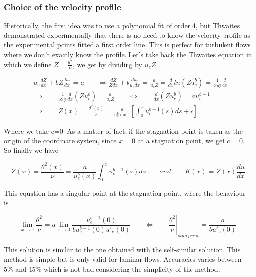 \subsubsection{Choice of the velocity profile}
Historically, the first idea was to use a polynomial fit of order 4, but Thwaites demonstrated experimentally that there is no need to know the velocity profile as the experimental points fitted a first order line. This is perfect for turbulent flows where we don't exactly know the profile. Let's take back the Thwaites equation in which we define $Z=\frac{\theta^2}{\nu}$, we get by dividing by $u_eZ$

\begin{equation} 
\begin{aligned}
&u_e\frac{d Z}{d x}+ bZ\frac{d u_e}{d x}=a \qquad \Rightarrow \frac{d Z}{Z d x}+b \frac{d u_e}{u_e d x}=\frac{a}{u_eZ}  = \frac{d }{d x} ln(Zu_e^b) = \frac{1}{Zu_e^b}\frac{d }{d x} \\
&\Rightarrow \qquad \frac{1}{Zu_e^b}\frac{d }{d x} (Zu_e^b)=\frac{a}{u_eZ} \qquad  \Leftrightarrow \qquad \frac{d }{d x} (Zu_e^b)=au_e^{b-1}\\
&\Rightarrow \qquad Z(x)=\frac{\theta^2(x)}{\nu}=\frac{a}{u_e^b(x)}\left[\int_0^x u_e^{b-1}(s) d s +c\right]
\end{aligned}
\end{equation}

Where we take c=0. As a matter of fact, if the stagnation point is taken as the origin of the coordinate system, since $x=0$ at a stagnation point, we get $c=0$. So finally we have

\begin{equation}
 Z(x)=\frac{\theta^2(x)}{\nu}=\frac{a}{u_e^b(x)}\int_0^x u_e^{b-1}(s) d s \qquad and \qquad K(x) = Z(x) \frac{du}{dx}
\end{equation}

This equation has a singular point at the stagnation point, where the behaviour is

\begin{equation}
\lim_{x \rightarrow 0} \frac{\theta^2}{\nu}=a \lim_{x \rightarrow 0} \frac{u_e^{b-1}(0)}{bu_e^{b-1}(0) u'_e(0)} \qquad\Leftrightarrow \qquad \left.\frac{\theta^2}{\nu}\right|_{stag.point}=\frac{a}{bu'_e(0)}
\end{equation}

This solution is similar to the one obtained with the self-similar solution.
This method is simple but is only valid for laminar flows. Accuracies varies between  5\%  and 15\% which is not bad considering the simplicity of the method.

